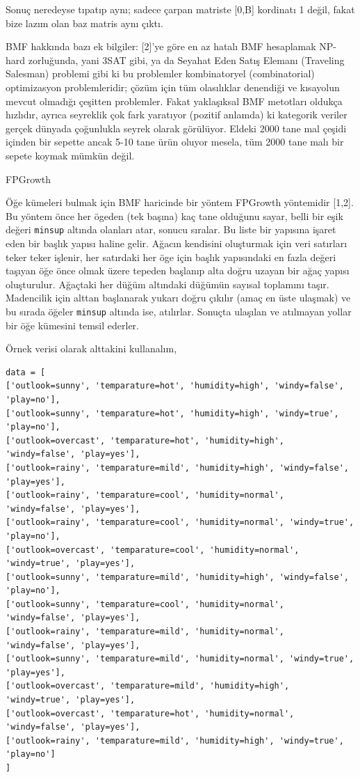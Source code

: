 \documentclass[12pt,fleqn]{article}\usepackage{../../common}
\begin{document}
Sonuç neredeyse tıpatıp aynı; sadece çarpan matriste [0,B] kordinatı 1
değil, fakat bize lazım olan baz matris aynı çıktı. 

BMF hakkında bazı ek bilgiler: [2]'ye göre en az hatalı BMF hesaplamak
NP-hard zorluğunda, yani 3SAT gibi, ya da Seyahat Eden Satış Elemanı
(Traveling Salesman) problemi gibi ki bu problemler kombinatoryel
(combinatorial) optimizasyon problemleridir; çözüm için tüm olasılıklar
denendiği ve kısayolun mevcut olmadığı çeşitten problemler. Fakat
yaklaşıksal BMF metotları oldukça hızlıdır, ayrıca seyreklik çok fark
yaratıyor (pozitif anlamda) ki kategorik veriler gerçek dünyada çoğunlukla
seyrek olarak görülüyor. Eldeki 2000 tane mal çeşidi içinden bir sepette
ancak 5-10 tane ürün oluyor mesela, tüm 2000 tane malı bir sepete koymak
mümkün değil.

FPGrowth


Öğe kümeleri bulmak için BMF haricinde bir yöntem FPGrowth yöntemidir
[1,2]. Bu yöntem önce her ögeden (tek başına) kaç tane olduğunu sayar,
belli bir eşik değeri \verb!minsup! altında olanları atar, sonucu
sıralar. Bu liste bir yapısına işaret eden bir başlık yapısı haline
gelir. Ağacın kendisini oluşturmak için veri satırları teker teker işlenir,
her satırdaki her öge için başlık yapısındaki en fazla değeri taşıyan öğe
önce olmak üzere tepeden başlanıp alta doğru uzayan bir ağaç yapısı
oluşturulur. Ağaçtaki her düğüm altındaki düğümün sayısal toplamını
taşır. Madencilik için alttan başlanarak yukarı doğru çıkılır (amaç en üste
ulaşmak) ve bu sırada öğeler \verb!minsup! altında ise, atılırlar. Sonuçta
ulaşılan ve atılmayan yollar bir öğe kümesini temsil ederler. 

Örnek verisi olarak alttakini kullanalım,

\begin{verbatim}
data = [
['outlook=sunny', 'temparature=hot', 'humidity=high', 'windy=false', 'play=no'],
['outlook=sunny', 'temparature=hot', 'humidity=high', 'windy=true', 'play=no'],
['outlook=overcast', 'temparature=hot', 'humidity=high', 'windy=false', 'play=yes'],
['outlook=rainy', 'temparature=mild', 'humidity=high', 'windy=false', 'play=yes'],
['outlook=rainy', 'temparature=cool', 'humidity=normal', 'windy=false', 'play=yes'],
['outlook=rainy', 'temparature=cool', 'humidity=normal', 'windy=true', 'play=no'],
['outlook=overcast', 'temparature=cool', 'humidity=normal', 'windy=true', 'play=yes'],
['outlook=sunny', 'temparature=mild', 'humidity=high', 'windy=false', 'play=no'],
['outlook=sunny', 'temparature=cool', 'humidity=normal', 'windy=false', 'play=yes'],
['outlook=rainy', 'temparature=mild', 'humidity=normal', 'windy=false', 'play=yes'],
['outlook=sunny', 'temparature=mild', 'humidity=normal', 'windy=true', 'play=yes'],
['outlook=overcast', 'temparature=mild', 'humidity=high', 'windy=true', 'play=yes'],
['outlook=overcast', 'temparature=hot', 'humidity=normal', 'windy=false', 'play=yes'],
['outlook=rainy', 'temparature=mild', 'humidity=high', 'windy=true', 'play=no']
]
\end{verbatim}
\end{document}
